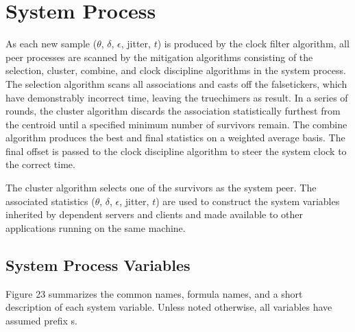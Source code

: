 \chapter{System Process}

As each new sample ($ \theta $, $ \delta $, $ \epsilon $, jitter, $ t $) is produced by
the clock filter algorithm, all peer processes are scanned by the
mitigation algorithms consisting of the selection, cluster, combine,
and clock discipline algorithms in the system process.  The selection
algorithm scans all associations and casts off the falsetickers,
which have demonstrably incorrect time, leaving the truechimers as
result.  In a series of rounds, the cluster algorithm discards the
association statistically furthest from the centroid until a
specified minimum number of survivors remain.  The combine algorithm
produces the best and final statistics on a weighted average basis.
The final offset is passed to the clock discipline algorithm to steer
the system clock to the correct time.

The cluster algorithm selects one of the survivors as the system
peer.  The associated statistics ($ \theta $, $ \delta $, $ \epsilon $, jitter, $ t $)
are used to construct the system variables inherited by dependent
servers and clients and made available to other applications running
on the same machine.

\section{System Process Variables}

Figure 23 summarizes the common names, formula names, and a short
description of each system variable.  Unless noted otherwise, all
variables have assumed prefix s.

